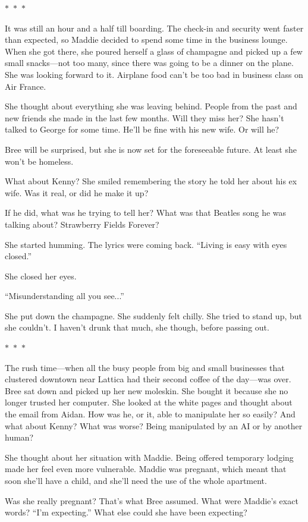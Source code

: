 \documentclass{memoir}
\newcommand{\starbreak}{%
\begin{center}
  $\ast$~$\ast$~$\ast$
\end{center}
}
\begin{document}
\starbreak

It was still an hour and a half till boarding. The check-in and security went faster than expected, so Maddie decided to spend some time in the business lounge. When she got there, she poured herself a glass of champagne and picked up a few small snacks---not too many, since there was going to be a dinner on the plane. She was looking forward to it. Airplane food can't be too bad in business class on Air France. 

She thought about everything she was leaving behind. People from the past and new friends she made in the last few months. Will they miss her? She hasn't talked to George for some time. He'll be fine with his new wife. Or will he? 

Bree will be surprised, but she is now set for the foreseeable future. At least she won't be homeless.

What about Kenny? She smiled remembering the story he told her about his ex wife. Was it real, or did he make it up? 

If he did, what was he trying to tell her? What was that Beatles song he was talking about? Strawberry Fields Forever? 

She started humming. The lyrics were coming back. ``Living is easy with eyes closed.'' 

She closed her eyes.

``Misunderstanding all you see...'' 

She put down the champagne. She suddenly felt chilly. She tried to stand up, but she couldn't. I haven't drunk that much, she though, before passing out.

\starbreak

The rush time---when all the busy people from big and small businesses that clustered downtown near Lattica had their second coffee of the day---was over. Bree sat down and picked up her new moleskin. She bought it because she no longer trusted her computer. She looked at the white pages and thought about the email from Aidan. How was he, or it, able to manipulate her so easily? And what about Kenny? What was worse? Being manipulated by an AI or by another human? 

She thought about her situation with Maddie. Being offered temporary lodging made her feel even more vulnerable. Maddie was pregnant, which meant that soon she'll have a child, and she'll need the use of the whole apartment. 

Was she really pregnant? That's what Bree assumed. What were Maddie's exact words? ``I'm expecting.'' What else could she have been expecting? 
\end{document}
